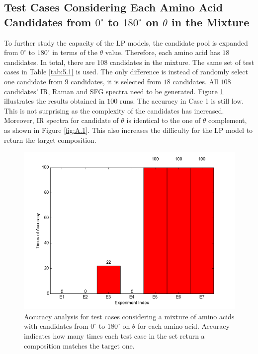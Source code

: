 \subsection{Test Cases Considering Each Amino Acid Candidates from $0^{\circ}$ to $180^{\circ}$ on $\theta$ in the Mixture}
To further study the capacity of the LP models, the candidate pool is expanded from $0^{\circ}$ to $180^{\circ}$ in terms of the $\theta$ value. Therefore, each amino acid has $18$ candidates. In total, there are $108$ candidates in the mixture. The same set of test cases in Table \ref{tab:5.1} is used. The only difference is instead of randomly select one candidate from $9$ candidates, it is selected from $18$ candidates. All $108$ candidates' IR, Raman and SFG spectra need to be generated. Figure \ref{fig:5.3} illustrates the results obtained in $100$ runs. The accuracy in Case 1 is still low. This is not surprising as the complexity of the candidates has increased. Moreover, IR spectra for candidate of $\theta$ is identical to the one of $\theta$ complement, as shown in Figure \ref{fig:A.1}. This also increases the difficulty for the LP model to return the target composition. \\

\begin{figure}[!ht]
\centering
\includegraphics[scale=0.7]{Figures/accuracy_pecent_result10_mixture.png}
\caption{Accuracy analysis for test cases considering a mixture of amino acids with candidates from $0^{\circ}$ to $180^{\circ}$ on $\theta$ for each amino acid. Accuracy indicates how many times each test case in the set return a composition matches the target one.} \label{fig:5.3}
\end{figure}

